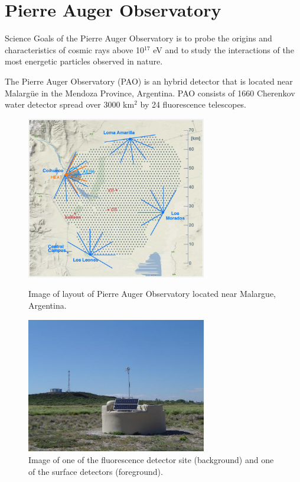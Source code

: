 \chapter{Pierre Auger Observatory}\label{Ch:PAO}


Science Goals of the Pierre Auger Observatory is to probe the origins and characteristics of cosmic rays above 10$^{17}$ eV and to study the interactions of the most energetic particles observed in nature.

The Pierre Auger Observatory (PAO) is an hybrid detector that is located near Malarg\"ue in the Mendoza Province, Argentina. PAO consists of 1660 Cherenkov water detector spread over 3000 km$^2$  by 24 fluorescence telescopes. 

\begin{figure}[hp]
\centering
\includegraphics[width=0.7\textwidth]{chapters/pix/PAO_equipment_layout_overview.png}
\caption{Image of layout of Pierre Auger Observatory located near Malargue, Argentina.}
\label{fig:PAO_layout}
\includegraphics[width=0.7\textwidth]{chapters/pix/pierre-auger-observatory_tankAndTelescope.jpg}
\caption{Image of one of the fluorescence detector site (background) and one of the surface detectors (foreground).}
\label{fig:PAO_TankAndTelescope}
\end{figure}


